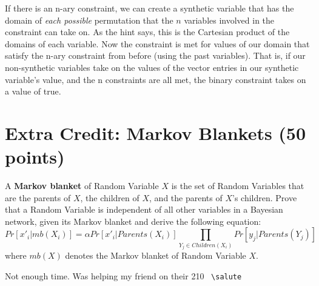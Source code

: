 \documentclass[11pt]{article}
\newcommand{\question}[1]{\section*{\normalsize #1}}
\begin{document}
If there is an n-ary constraint, we can create a synthetic variable that has the domain of \textit{each possible} permutation that the $n$ variables involved in the constraint can take on. As the hint says, this is the Cartesian product of the domains of each variable. Now the constraint is met for values of our domain that satisfy the n-ary constraint from before (using the past variables). That is, if our non-synthetic variables take on the values of the vector entries in our synthetic variable's value, and the n constraints are all met, the binary constraint takes on a value of true.

\newpage
\question{Extra Credit: Markov Blankets (50 points)}
A \textbf{Markov blanket} of Random Variable $X$ is the set of Random Variables that are the parents of $X$, the children of $X$, and the parents of $X$'s children. Prove that a Random Variable is independent of all other variables in a Bayesian network, given its Markov blanket and derive the following equation:
$$Pr[x'_i | mb(X_i)] = \alpha Pr[x'_i | Parents(X_i)]\prod\limits_{Y_j\in Children(X_i)} Pr[y_j | Parents(Y_j)]$$
where $mb(X)$ denotes the Markov blanket of Random Variable $X$.

\medskip
Not enough time. Was helping my friend on their 210~ \verb|\salute|
\end{document}
